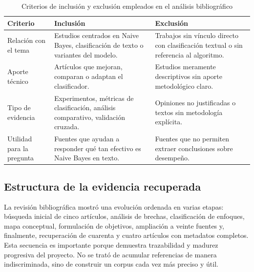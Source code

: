 \begin{table}[H]
\centering
\caption{Criterios de inclusión y exclusión empleados en el análisis bibliográfico}
\label{tab:criterios}
\small
\begin{tabularx}{\textwidth}{|L{3.2cm}|X|X|}
\hline
\textbf{Criterio} & \textbf{Inclusión} & \textbf{Exclusión} \\ \hline
Relación con el tema & Estudios centrados en Naive Bayes, clasificación de texto o variantes del modelo. & Trabajos sin vínculo directo con clasificación textual o sin referencia al algoritmo. \\ \hline
Aporte técnico & Artículos que mejoran, comparan o adaptan el clasificador. & Estudios meramente descriptivos sin aporte metodológico claro. \\ \hline
Tipo de evidencia & Experimentos, métricas de clasificación, análisis comparativo, validación cruzada. & Opiniones no justificadas o textos sin metodología explícita. \\ \hline
Utilidad para la pregunta & Fuentes que ayudan a responder qué tan efectivo es Naive Bayes en texto. & Fuentes que no permiten extraer conclusiones sobre desempeño. \\ \hline
\end{tabularx}
\end{table}

\subsection{Estructura de la evidencia recuperada}

La revisión bibliográfica mostró una evolución ordenada en varias etapas: búsqueda inicial de cinco artículos, análisis de brechas, clasificación de enfoques, mapa conceptual, formulación de objetivos, ampliación a veinte fuentes y, finalmente, recuperación de cuarenta y cuatro artículos con metadatos completos. Esta secuencia es importante porque demuestra trazabilidad y madurez progresiva del proyecto. No se trató de acumular referencias de manera indiscriminada, sino de construir un corpus cada vez más preciso y útil.


